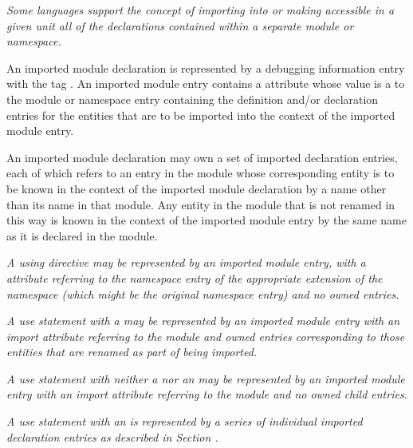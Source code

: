 \textit{Some languages support the concept of importing into or making
accessible in a given unit all of the declarations contained
within a separate module or namespace.
}

An imported module declaration is represented by a debugging
information entry with
the
tag \DWTAGimportedmoduleTARG.
An
imported module entry contains a
\DWATimport{} attribute
whose value is a 
to the module or namespace entry
containing the definition and/or declaration entries for
the entities that are to be imported into the context of the
imported module entry.

An imported module declaration may own a set of imported
declaration entries, each of which refers to an entry in the
module whose corresponding entity is to be known in the context
of the imported module declaration by a name other than its
name in that module. Any entity in the module that is not
renamed in this way is known in the context of the imported
module entry by the same name as it is declared in the module.

\textit{A  using directive
may be represented by an imported
module\hypertarget{chap:DWATimportnamespaceusingdirective}{}
entry, with a \DWATimportDEFN{} attribute referring to the namespace
entry of the appropriate extension of the namespace (which
might be the original namespace entry) and no owned entries.
}

\textit{A  use statement
with a  may be
represented by an imported module entry with an import
attribute referring to the module and owned entries
corresponding to those entities that are renamed as part of
being imported.
}

\textit{A  use statement
with neither a  nor
an  may be represented by an imported module
entry with an import attribute referring to the module and
no owned child entries.
}

\textit{A use statement with an  is represented by a
series of individual imported declaration entries as described
in Section .
}

